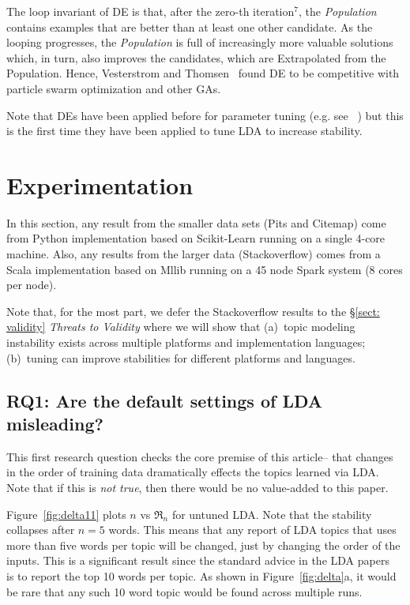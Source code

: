 \documentclass[10pt,conference]{IEEEtran}
\theoremstyle{break}
\begin{document}
The loop invariant of DE is that, after the zero-th iteration$^7$, the \textit{Population}
contains examples that are better than at least one other candidate.
As the looping progresses, the \textit{Population} is full of increasingly more valuable solutions
which, in turn, also improves the candidates, which are Extrapolated from the Population.
Hence, Vesterstrom and Thomsen~\cite{vesterstrom2004comparative} found DE to be
competitive with particle swarm optimization and other GAs.

Note that DEs have been
applied before for parameter tuning (e.g. see~\cite{panichella2013effectively, lohar2013improving, sun2015msr4sm,%
omran2005differential,chiha2012tuning, fu2016tuning} ) but this is the first time they have been
applied to tune LDA to increase stability.



\section{Experimentation}


In this section,
 any result from the smaller data sets (Pits and Citemap) come
from Python implementation based on Scikit-Learn running on a single 4-core machine.
Also,
  any results from the larger data (Stackoverflow) comes from a Scala implementation
  based on Mllib running on a 45 node Spark system (8 cores per node).
  
  Note that, for the most part, we defer the Stackoverflow results to the \S\ref{sect: validity} {\em Threats to Validity} where we will show that (a)~topic modeling instability
  exists across multiple platforms and  implementation languages; (b)~tuning
  can improve stabilities for different platforms and languages.


\subsection{\textbf{RQ1: Are the default settings of LDA misleading?}}


This first research question checks the core premise of this article-- that changes
in the order of training data dramatically effects the topics learned via LDA.
Note that if this is {\em not true}, then there would be no value-added to this paper.


Figure~\ref{fig:delta11}   plots $n$ vs $\Re_n$ for untuned  LDA.
Note that the  stability collapses after $n=5$ words. This means
  that any report of LDA topics that uses more than five words per topic will
  be changed, just by changing the order of the inputs. This is a significant result
  since the standard advice in the LDA papers~\cite{panichella2013effectively, lukins2010bug}
  is to report the top 10 words per topic. As shown in Figure~\ref{fig:delta}a, it would
  be rare that any such 10 word topic would be found across multiple runs.
  
\end{document}
